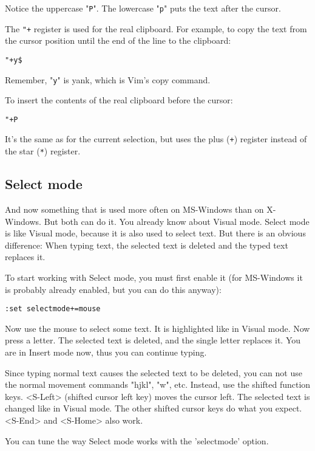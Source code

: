 Notice the uppercase "\verb!P!".
The lowercase "\verb!p!" puts the text after the cursor.

The \verb!"+! register is used for the real clipboard.
For example, to copy the text from the cursor position until the end of the line to the clipboard:

 \begin{Verbatim}[samepage=true]
 "+y$
 \end{Verbatim}

Remember, "\verb!y!" is yank, which is Vim's copy command.

To insert the contents of the real clipboard before the cursor:

 \begin{Verbatim}[samepage=true]
 "+P
 \end{Verbatim}

It's the same as for the current selection, but uses the plus (\verb!+!) register instead of the star (\verb!*!) register.
\subsection{Select mode}
\label{Select mode}
And now something that is used more often on MS-Windows than on X-Windows.
But both can do it.
You already know about Visual mode.
Select mode is like Visual mode, because it is also used to select text.
But there is an obvious difference: When typing text, the selected text is deleted and the typed text replaces it.

To start working with Select mode, you must first enable it (for MS-Windows it is probably already enabled, but you can do this anyway):

 \begin{Verbatim}[samepage=true]
 :set selectmode+=mouse
 \end{Verbatim}

Now use the mouse to select some text.
It is highlighted like in Visual mode.
Now press a letter.
The selected text is deleted, and the single letter replaces it.
You are in Insert mode now, thus you can continue typing.

Since typing normal text causes the selected text to be deleted, you can not use the normal movement commands "hjkl", "w", etc.
Instead, use the shifted function keys.
<S-Left> (shifted cursor left key) moves the cursor left.
The selected text is changed like in Visual mode.
The other shifted cursor keys do what you expect.
<S-End> and <S-Home> also work.

You can tune the way Select mode works with the 'selectmode' option.
\clearpage
